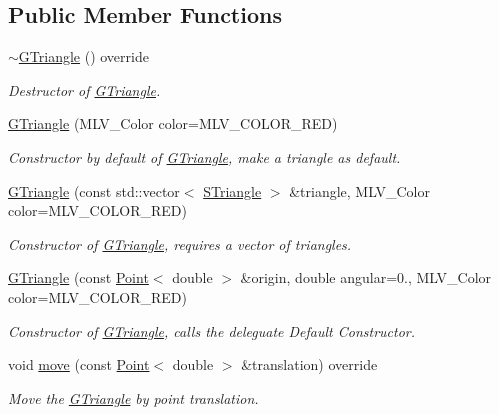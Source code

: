 \subsection*{Public Member Functions}
\begin{DoxyCompactItemize}
\item 
\mbox{\label{classGTriangle_a05bcaee071e6dc6591220869234b05ee}} 
\hyperlink{classGTriangle_a05bcaee071e6dc6591220869234b05ee}{$\sim$\+G\+Triangle} () override
\begin{DoxyCompactList}\small\item\em Destructor of \hyperlink{classGTriangle}{G\+Triangle}. \end{DoxyCompactList}\item 
\hyperlink{classGTriangle_ad4e9c12fdff32b737ca9e67d64c339bc}{G\+Triangle} (M\+L\+V\+\_\+\+Color color=M\+L\+V\+\_\+\+C\+O\+L\+O\+R\+\_\+\+R\+ED)
\begin{DoxyCompactList}\small\item\em Constructor by default of \hyperlink{classGTriangle}{G\+Triangle}, make a triangle as default. \end{DoxyCompactList}\item 
\hyperlink{classGTriangle_a1b5220a52053342a4aa85499e328b9ea}{G\+Triangle} (const std\+::vector$<$ \hyperlink{classSTriangle}{S\+Triangle} $>$ \&triangle, M\+L\+V\+\_\+\+Color color=M\+L\+V\+\_\+\+C\+O\+L\+O\+R\+\_\+\+R\+ED)
\begin{DoxyCompactList}\small\item\em Constructor of \hyperlink{classGTriangle}{G\+Triangle}, requires a vector of triangles. \end{DoxyCompactList}\item 
\hyperlink{classGTriangle_a1af75c4d0dc8f03e6e4b1b66f0e463ff}{G\+Triangle} (const \hyperlink{classPoint}{Point}$<$ double $>$ \&origin, double angular=0., M\+L\+V\+\_\+\+Color color=M\+L\+V\+\_\+\+C\+O\+L\+O\+R\+\_\+\+R\+ED)
\begin{DoxyCompactList}\small\item\em Constructor of \hyperlink{classGTriangle}{G\+Triangle}, calls the deleguate Default Constructor. \end{DoxyCompactList}\item 
void \hyperlink{classGTriangle_a6675f3448fca16c1afec576145a9b139}{move} (const \hyperlink{classPoint}{Point}$<$ double $>$ \&translation) override
\begin{DoxyCompactList}\small\item\em Move the \hyperlink{classGTriangle}{G\+Triangle} by point translation. \end{DoxyCompactList}\item 

\end{DoxyCompactItemize}
